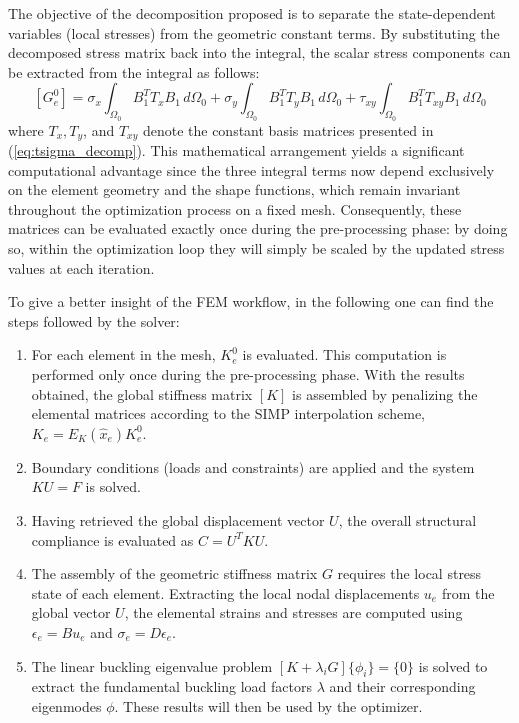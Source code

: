 \documentclass{article}
\begin{document}
The objective of the decomposition proposed is to separate the state-dependent variables (local stresses) from the geometric constant terms. By substituting the decomposed stress matrix back into the integral, the scalar stress components can be extracted from the integral as follows:
\begin{equation}\label{eq:ge0_expanded}
[G_e^0] = \sigma_x \int_{\Omega_0} B_1^T T_x B_1 \, d\Omega_0 + \sigma_y \int_{\Omega_0} B_1^T T_y B_1 \, d\Omega_0 + \tau_{xy} \int_{\Omega_0} B_1^T T_{xy} B_1 \, d\Omega_0
\end{equation}
\noindent where $T_x, T_y$, and $T_{xy}$ denote the constant basis matrices presented in (\ref{eq:tsigma_decomp}). This mathematical arrangement yields a significant computational advantage since the three integral terms now depend exclusively on the element geometry and the shape functions, which remain invariant throughout the optimization process on a fixed mesh. Consequently, these matrices can be evaluated exactly once during the pre-processing phase: by doing so, within the optimization loop they will simply be scaled by the updated stress values at each iteration.

\vspace{\baselineskip}
To give a better insight of the FEM workflow, in the following one can find the steps followed by the solver:
\begin{enumerate}
    \item For each element in the mesh, $K_e^0$ is evaluated. This computation is performed only once during the pre-processing phase. With the results obtained, the global stiffness matrix $[K]$ is assembled by penalizing the elemental matrices according to the SIMP interpolation scheme, $K_e = E_K(\hat{x}_e)K_e^0$.
    \item Boundary conditions (loads and constraints) are applied and the system $KU = F$ is solved.
    \item Having retrieved the global displacement vector $U$, the overall structural compliance is evaluated as $C = U^T K U$.
    \item The assembly of the geometric stiffness matrix $G$ requires the local stress state of each element. Extracting the local nodal displacements $u_e$ from the global vector $U$, the elemental strains and stresses are computed using $\epsilon_e = B u_e$ and $\sigma_e = D \epsilon_e$.
    \item The linear buckling eigenvalue problem $[K + \lambda_i G]\{\phi_i\} = \{0\}$ is solved to extract the fundamental buckling load factors $\lambda$ and their corresponding eigenmodes $\phi$. These results will then be used by the optimizer.
\end{enumerate}
\end{document}
